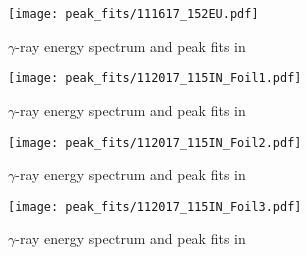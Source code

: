 \begin{figure}[htb]
\texttt{[image: peak\_fits/111617\_152EU.pdf]}
\caption{$\gamma$-ray energy spectrum and peak fits in \texttt{}}
\label{fig:111617_152EU}
\end{figure}

\begin{figure}[htb]
\texttt{[image: peak\_fits/112017\_115IN\_Foil1.pdf]}
\caption{$\gamma$-ray energy spectrum and peak fits in \texttt{}}
\label{fig:112017_115IN_Foil1}
\end{figure}

\begin{figure}[htb]
\texttt{[image: peak\_fits/112017\_115IN\_Foil2.pdf]}
\caption{$\gamma$-ray energy spectrum and peak fits in \texttt{}}
\label{fig:112017_115IN_Foil2}
\end{figure}

\begin{figure}[htb]
\texttt{[image: peak\_fits/112017\_115IN\_Foil3.pdf]}
\caption{$\gamma$-ray energy spectrum and peak fits in \texttt{}}
\label{fig:112017_115IN_Foil3}
\end{figure}

